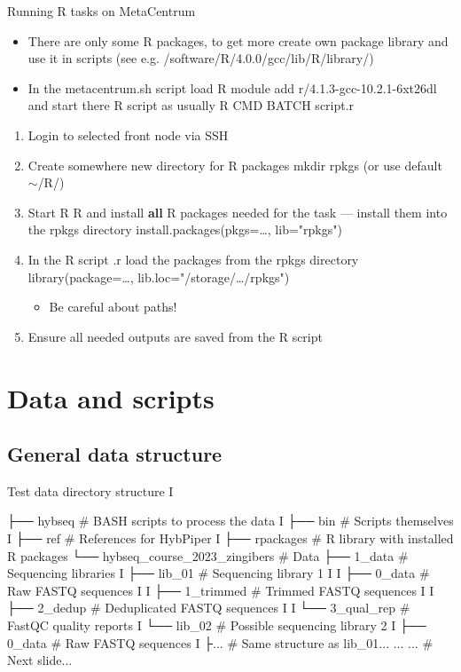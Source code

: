 \documentclass[compress,  xelatex, 11pt, xcolor=x11names, aspectratio=169,
	hyperref={
		bookmarks=true,
		unicode=true,
		colorlinks=true,
		pdftitle={HybSeq course},
		plainpages=false,
		pdfauthor={Vojtech Zeisek},
		pdfsubject={Practical processing of HybSeq target enrichment sequencing data on computing grids like MetaCentrum},
		pdfcreator={XeLaTeX},
		pdfkeywords={BASH, command line, GNU, HybSeq, Linux, MetaCentrum, sequencing shell, target enrichment},
		linkcolor=Turquoise4, %
		anchorcolor=DodgerBlue4, %
		citecolor=DodgerBlue4, %
		filecolor=DodgerBlue4, %
		menucolor=Tan4, %
		urlcolor=DarkOliveGreen4 %
		},
	url={hyphens, lowtilde} %
	]{beamer}
\renewcommand{\texttt}[1]{\colorbox{Cornsilk2}{{\ttfamily #1}}}
\renewcommand{\alert}[1]{\textcolor{OrangeRed3}{#1}}
\begin{document}
\begin{frame}{Running R tasks on MetaCentrum}
	\begin{itemize}
		\item There are only some R packages, to get more create own package library and use it in scripts (see e.g. \texttt{/software/R/4.0.0/gcc/lib/R/library/})
		\item In the \texttt{metacentrum.sh} script load R \texttt{module add r/4.1.3-gcc-10.2.1-6xt26dl} and start there R script as usually \texttt{R CMD BATCH script.r}
	\end{itemize}
	\begin{enumerate}
		\item Login to selected front node via SSH
		\item Create somewhere new directory for R packages \texttt{mkdir rpkgs} (or use default \texttt{$\sim$/R/})
		\item Start R \texttt{R} and install \textbf{all} R packages needed for the task --- install them into the \texttt{rpkgs} directory \texttt{install.packages(pkgs=\ldots, lib="rpkgs")}
		\item In the R script \texttt{*.r} load the packages from the \texttt{rpkgs} directory \texttt{library(package=\ldots, lib.loc="/storage/\ldots/rpkgs")}
		\begin{itemize}
			\item \alert{Be careful about paths!}
		\end{itemize}
		\item Ensure all needed outputs are saved from the R script
	\end{enumerate}
\end{frame}

\section{Data and scripts}

\subsection{General data structure}

\begin{frame}[fragile]{Test data directory structure I}
	\label{datastructure}
	\begin{bashcode}
    ├── hybseq # BASH scripts to process the data
    I   ├── bin # Scripts themselves
    I   ├── ref # References for HybPiper
    I   ├── rpackages # R library with installed R packages
    └── hybseq_course_2023_zingibers # Data
        ├── 1_data # Sequencing libraries
        I   ├── lib_01 # Sequencing library 1
        I   I   ├── 0_data # Raw FASTQ sequences
        I   I   ├── 1_trimmed # Trimmed FASTQ sequences
        I   I   ├── 2_dedup # Deduplicated FASTQ sequences
        I   I   └── 3_qual_rep # FastQC quality reports
        I   └── lib_02 # Possible sequencing library 2
        I       ├── 0_data # Raw FASTQ sequences
        I       ├... # Same structure as lib_01...
        ...     ... # Next slide...
	\end{bashcode}
\end{frame}
\end{document}
